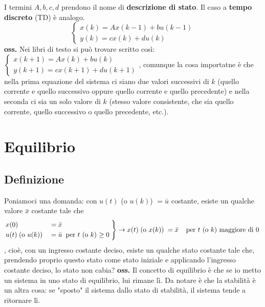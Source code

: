 I termini $A, b, c, d$ prendono il nome di \textbf{descrizione di stato}.\newline
\newline
Il caso a \textbf{tempo discreto} (TD) è analogo.
\[
    \begin{cases}
        x(k) = Ax(k-1) + bu(k-1)\\
        y(k) = cx(k) +d u(k)
    \end{cases}
\] 
\textbf{oss.} Nei libri di testo si può trovare scritto così: $\begin{cases}
    x(k+1) = Ax(k) + bu(k)\\
    y(k+1) = cx(k+1) +d u(k+1)
\end{cases}$, comunque la cosa importatne è che nella prima equazione del sistema ci siano due valori successivi di $k$ (quello corrente e quello successivo oppure quello corrente e quello precedente) e nella seconda ci sia un solo valore di $k$ (stesso valore consistente, che sia quello corrente, quello successivo o quello precedente, etc.).
\newpage
\section{Equilibrio}
\subsection{Definizione}
Poniamoci una domanda: con $u(t)$ (o $u(k)$) $=\bar{u}$ costante, esiste un qualche valore $\bar{x}$ costante tale che 
\[
    \begin{rcases}
        x(0) &= \bar{x}\\
        u(t) \;\text{(o $u(k)$)}\; &= \bar{u} \;\;\text{per $t$ (o $k$) $\geq 0$}\;
    \end{rcases} \rightarrow x(t) \;\text{(o $x(k)$)}\; = \bar{x} \;\;\;\;\text{per $t$ (o $k$) maggiore di 0}\;
\]
, cioè, con un ingresso costante deciso, esiste un qualche stato costante tale che, prendendo proprio questo stato come stato iniziale e applicando l'ingresso costante deciso, lo stato non cabia?\newline
\newline
\textbf{oss.} Il concetto di equilibrio è che se io metto un sistema in uno stato di equilibrio, lui rimane lì. Da notare è che la stabilità è un altra cosa: se "sposto" il sistema dallo stato di stabilità, il sistema tende a ritornare lì.
